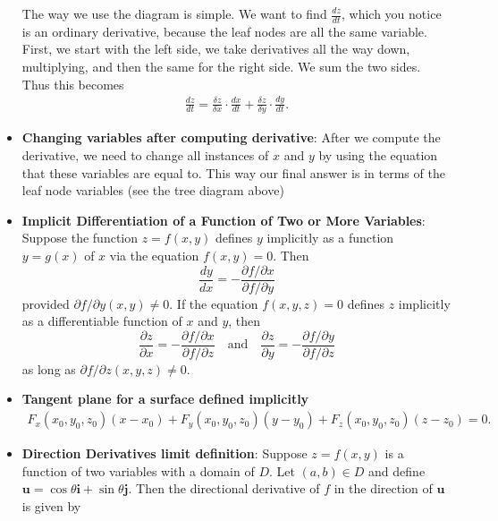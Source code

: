 \documentclass{report}
\begin{document}
\begin{itemize}
\begin{figure}[ht]
    \end{figure}
    \bigbreak \noindent 
    \bigbreak \noindent 
    The way we use the diagram is simple. We want to find $\frac{dz}{dt}$, which you notice is an ordinary derivative, because the leaf nodes are all the same variable. First, we start with the left side, we take derivatives all the way down, multiplying, and then the same for the right side. We sum the two sides. Thus this becomes
    \begin{align*}
        \frac{dz}{dt} = \frac{\delta z}{\delta x} \cdot \frac{dx}{dt}  + \frac{\delta z}{\delta y} \cdot \frac{dy}{dt}
    .\end{align*}
    \bigbreak \noindent 
    \item \textbf{Changing variables after computing derivative}: After we compute the derivative, we need to change all instances of $x$ and $y$ by using the equation that these variables are equal to. This way our final answer is in terms of the leaf node variables (see the tree diagram above)
    \item \textbf{Implicit Differentiation of a Function of Two or More Variables}:
        Suppose the function \(z = f(x,y)\) defines \(y\) implicitly as a function \(y = g(x)\) of \(x\) via the equation \(f(x,y) = 0\). Then
        \[
            \frac{dy}{dx} = -\frac{\partial f/\partial x}{\partial f/\partial y}
        \]
        provided \(\partial f/\partial y(x,y) \neq 0\).
        \bigbreak \noindent 
        If the equation \(f(x,y,z) = 0\) defines \(z\) implicitly as a differentiable function of \(x\) and \(y\), then
        \[
            \frac{\partial z}{\partial x} = -\frac{\partial f/\partial x}{\partial f/\partial z} \quad \text{and} \quad \frac{\partial z}{\partial y} = -\frac{\partial f/\partial y}{\partial f/\partial z}
        \]
        as long as \(\partial f/\partial z(x,y,z) \neq 0\).
    \item \textbf{Tangent plane for a surface defined implicitly}
        \begin{align*}
            F_{x}(x_{0},y_{0},z_{0})(x-x_{0}) + F_{y}(x_{0}, y_{0}, z_{0})(y-y_{0}) + F_{z}(x_{0}, y_{0}, z_{0})(z-z_{0}) = 0
        .\end{align*}
    \item \textbf{Direction Derivatives limit definition}:
        Suppose $z=f(x,y)$ is a function of two variables with a domain of $D$. Let $(a,b) \in D$ and define $\mathbf{u}=\cos\theta \mathbf{i} + \sin\theta \mathbf{j}$. Then the directional derivative of $f$ in the direction of $\mathbf{u}$ is given by

\end{itemize}
\end{document}
